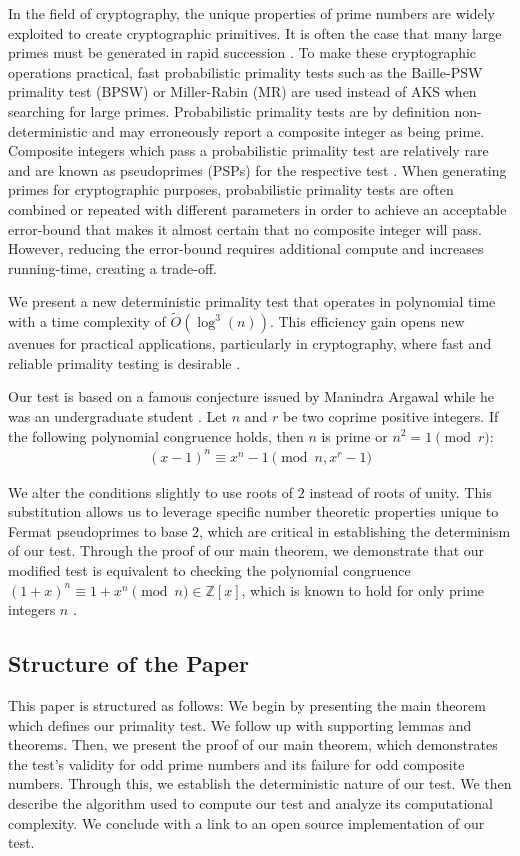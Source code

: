 \documentclass{article}
\theoremstyle{plain}
\theoremstyle{definition}
\begin{document}
In the field of cryptography, the unique properties of prime numbers are widely exploited to create cryptographic primitives. It is often the case that many large primes must be generated in rapid succession \cite{lenstra1987}. To make these cryptographic operations practical, fast probabilistic primality tests such as the Baille-PSW primality test (BPSW) \cite{baillie1980} or Miller-Rabin (MR) \cite{rabin1980} \cite{miller1976} are used instead of AKS when searching for large primes. Probabilistic primality tests are by definition non-deterministic and may erroneously report a composite integer as being prime. Composite integers which pass a probabilistic primality test are relatively rare and are known as pseudoprimes (PSPs) for the respective test \cite{wagstaff1983}. When generating primes for cryptographic purposes, probabilistic primality tests are often combined or repeated with different parameters in order to achieve an acceptable error-bound that makes it almost certain that no composite integer will pass. However, reducing the error-bound requires additional compute and increases running-time, creating a trade-off.

We present a new deterministic primality test that operates in polynomial time with a time complexity of $\tilde{O}(\log^3(n))$. This efficiency gain opens new avenues for practical applications, particularly in cryptography, where fast and reliable primality testing is desirable \cite{pomerance1984}. 

Our test is based on a famous conjecture issued by Manindra Argawal while he was an undergraduate student \cite{aks2002}. Let $n$ and $r$ be two coprime positive integers. If the following polynomial congruence holds, then $n$ is prime or $n^2 = 1 \pmod{r}$:
\begin{align}
    (x - 1)^n \equiv x^n - 1 \pmod{n, x^r - 1}
\end{align}

We alter the conditions slightly to use roots of $2$ instead of roots of unity. This substitution allows us to leverage specific number theoretic properties unique to Fermat pseudoprimes to base $2$, which are critical in establishing the determinism of our test. Through the proof of our main theorem, we demonstrate that our modified test is equivalent to checking the polynomial congruence $(1 + x)^n \equiv 1 + x^n \pmod{n} \in \mathbb{Z}[x]$, which is known to hold for only prime integers $n$ \cite{granville2004primes}.

\subsection{Structure of the Paper}
This paper is structured as follows: We begin by presenting the main theorem which defines our primality test. We follow up with supporting lemmas and theorems. Then, we present the proof of our main theorem, which demonstrates the test's validity for odd prime numbers and its failure for odd composite numbers. Through this, we establish the deterministic nature of our test. We then describe the algorithm used to compute our test and analyze its computational complexity. We conclude with a link to an open source implementation of our test.
\end{document}
